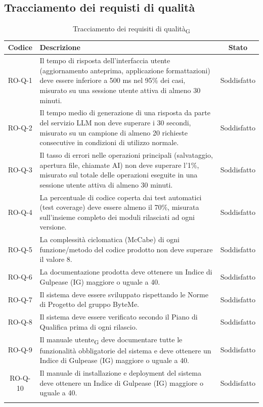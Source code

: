 \documentclass[11pt,a4paper]{article}
\newcommand{\gls}[1]{#1\textsubscript{G}}
\begin{document}
\subsection{Tracciamento dei requisti di qualità}
\begin{longtable}{|c|p{11cm}|c|}
\hline
\textbf{Codice} & \textbf{Descrizione} & \textbf{Stato}\\
\hline
\endhead
RO-Q-1 & Il tempo di risposta dell'interfaccia utente (aggiornamento anteprima, applicazione formattazioni) deve essere inferiore a 500 ms nel 95\% dei casi, misurato su una sessione utente attiva di almeno 30 minuti. & Soddisfatto \\
\hline
RO-Q-2 & Il tempo medio di generazione di una risposta da parte del servizio LLM non deve superare i 30 secondi, misurato su un campione di almeno 20 richieste consecutive in condizioni di utilizzo normale.  & Soddisfatto \\
\hline
RO-Q-3 & Il tasso di errori nelle operazioni principali (salvataggio, apertura file, chiamate AI) non deve superare l'1\%, misurato sul totale delle operazioni eseguite in una sessione utente attiva di almeno 30 minuti. & Soddisfatto \\
\hline
RO-Q-4 & La percentuale di codice coperta dai test automatici (test coverage) deve essere almeno il 70\%, misurata sull'insieme completo dei moduli rilasciati ad ogni versione. & Soddisfatto \\
\hline
RO-Q-5 & La complessità ciclomatica (McCabe) di ogni funzione/metodo del codice prodotto non deve superare il valore 8. & Soddisfatto \\
\hline
RO-Q-6 & La documentazione prodotta deve ottenere un Indice di Gulpease (IG) maggiore o uguale a 40. & Soddisfatto \\
\hline
RO-Q-7 & Il sistema deve essere sviluppato rispettando le Norme 
di Progetto del gruppo ByteMe. & Soddisfatto \\
\hline
RO-Q-8 & Il sistema deve essere verificato secondo il Piano di Qualifica prima di ogni rilascio. & Soddisfatto\\
\hline
RO-Q-9 & Il \gls{manuale utente} deve documentare tutte le funzionalità obbligatorie del sistema e deve ottenere un Indice di Gulpease (IG) maggiore o uguale a 40. & Soddisfatto \\
\hline
RO-Q-10 & Il manuale di installazione e deployment del sistema deve ottenere un Indice di Gulpease (IG) maggiore o uguale a 40. & Soddisfatto \\
\hline
\addlinespace[1em]
\caption{Tracciamento dei \gls{requisiti di qualità}}
\label{tab:tracciamento_requisiti_qualità}
\end{longtable}
\end{document}
